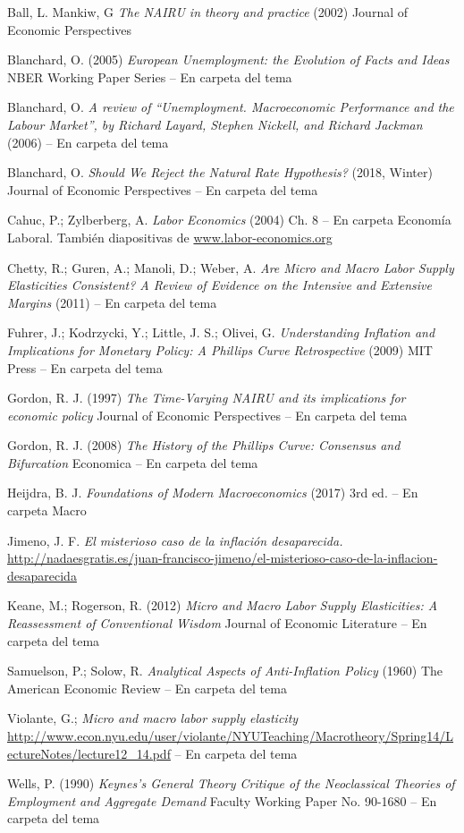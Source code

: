 \documentclass{nuevotema}
\begin{document}
Ball, L. Mankiw, G \textit{The NAIRU in theory and practice} (2002) Journal of Economic Perspectives

Blanchard, O. (2005) \textit{European Unemployment: the Evolution of Facts and Ideas} NBER Working Paper Series -- En carpeta del tema

Blanchard, O. \textit{A review of ``Unemployment. Macroeconomic Performance and the Labour Market'', by Richard Layard, Stephen Nickell, and Richard Jackman} (2006) -- En carpeta del tema

Blanchard, O. \textit{Should We Reject the Natural Rate Hypothesis?} (2018, Winter) Journal of Economic Perspectives -- En carpeta del tema

Cahuc, P.; Zylberberg, A. \textit{Labor Economics} (2004) Ch. 8 -- En carpeta Economía Laboral. También diapositivas de \url{www.labor-economics.org}

Chetty, R.; Guren, A.; Manoli, D.; Weber, A. \textit{Are Micro and Macro Labor Supply Elasticities Consistent? A Review of Evidence on the Intensive and Extensive Margins} (2011) -- En carpeta del tema

Fuhrer, J.; Kodrzycki, Y.; Little, J. S.; Olivei, G. \textit{Understanding Inflation and Implications for Monetary Policy: A Phillips Curve Retrospective} (2009) MIT Press -- En carpeta del tema

Gordon, R. J. (1997) \textit{The Time-Varying NAIRU and its implications for economic policy} Journal of Economic Perspectives -- En carpeta del tema

Gordon, R. J. (2008) \textit{The History of the Phillips Curve: Consensus and Bifurcation} Economica -- En carpeta del tema

Heijdra, B. J. \textit{Foundations of Modern Macroeconomics} (2017) 3rd ed. -- En carpeta Macro

Jimeno, J. F. \textit{El misterioso caso de la inflación desaparecida.} \url{http://nadaesgratis.es/juan-francisco-jimeno/el-misterioso-caso-de-la-inflacion-desaparecida}

Keane, M.; Rogerson, R. (2012) \textit{Micro and Macro Labor Supply Elasticities: A Reassessment of Conventional Wisdom} Journal of Economic Literature -- En carpeta del tema

Samuelson, P.; Solow, R. \textit{Analytical Aspects of Anti-Inflation Policy} (1960) The American Economic Review -- En carpeta del tema

Violante, G.; \textit{ Micro and macro labor supply elasticity} \url{http://www.econ.nyu.edu/user/violante/NYUTeaching/Macrotheory/Spring14/LectureNotes/lecture12_14.pdf} -- En carpeta del tema

Wells, P. (1990) \textit{Keynes's General Theory Critique of the Neoclassical Theories of Employment and Aggregate Demand} Faculty Working Paper No. 90-1680 -- En carpeta del tema
\end{document}
